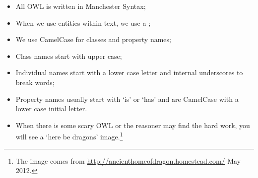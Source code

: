 \begin{itemize}
\item All OWL is written in Manchester Syntax;
\item When we use \fhkb entities within text, we use a ;
\item We use CamelCase for classes and property names;
\item Class names start with upper case;
\item Individual names start with a lower case letter and internal underscores to break words;
\item Property names usually start with `is' or `has' and are CamelCase with a lower case initial letter.
\item When there is some scary OWL or the reasoner may find the \fhkb hard work, you will see a `here be dragons' image\herebedragons.\footnote{The image comes from \url{http://ancienthomeofdragon.homestead.com/} May 2012.}
\end{itemize}
